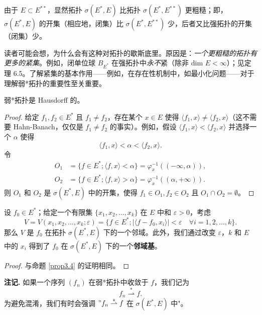 由于 $E \subset E^{**}$，显然拓扑 $\sigma(E^*, E)$ 比拓扑 $\sigma(E^*, E^{**})$ 更粗糙；即，$\sigma(E^*, E)$ 的开集（相应地，闭集）比 $\sigma(E^*, E^{**})$ 少，后者又比强拓扑的开集（闭集）少。

\begin{remark}\label{remark3.8}
读者可能会想，为什么会有这种对拓扑的歇斯底里。原因是：\textit{一个更粗糙的拓扑有更多的紧集}。例如，闭单位球 $B_{E^*}$ 在强拓扑中\textit{永不}紧（除非 dim $E < \infty$）；见定理 6.5。了解紧集的基本作用——例如，在存在性机制中，如最小化问题——对于理解弱*拓扑的重要性至关重要。
\end{remark}

\begin{proposition}\label{prop3.11}
弱*拓扑是 Hausdorff 的。
\end{proposition}

\begin{proof}
给定 $f_1, f_2 \in E^*$ 且 $f_1 \neq f_2$，存在某个 $x \in E$ 使得 $\langle f_1, x \rangle \neq \langle f_2, x \rangle$（这不需要 Hahn-Banach，仅仅是 $f_1 \neq f_2$ 的事实）。例如，假设 $\langle f_1, x \rangle < \langle f_2, x \rangle$ 并选择一个 $\alpha$ 使得
\[ \langle f_1, x \rangle < \alpha < \langle f_2, x \rangle. \]
令
\begin{align*}
O_1 &= \{ f \in E^*; \langle f, x \rangle < \alpha \} = \varphi_x^{-1}((-\infty, \alpha)), \\
O_2 &= \{ f \in E^*; \langle f, x \rangle > \alpha \} = \varphi_x^{-1}((\alpha, +\infty)).
\end{align*}
则 $O_1$ 和 $O_2$ 是 $\sigma(E^*, E)$ 中的开集，使得 $f_1 \in O_1, f_2 \in O_2$ 且 $O_1 \cap O_2 = \emptyset$。
\end{proof}

\begin{proposition}\label{prop3.12}
设 $f_0 \in E^*$；给定一个有限集 $\{x_1, x_2, \dots, x_k\}$ 在 $E$ 中和 $\varepsilon > 0$，考虑
\[ V = V(x_1, x_2, \dots, x_k; \varepsilon) = \{f \in E^*; |\langle f - f_0, x_i \rangle| < \varepsilon \quad \forall i = 1, 2, \dots, k\}. \]
那么 $V$ 是 $f_0$ 在拓扑 $\sigma(E^*, E)$ 下的一个邻域。此外，我们通过改变 $\varepsilon$，$k$ 和 $E$ 中的 $x_i$ 得到了 $f_0$ 在 $\sigma(E^*, E)$ 下的一个\textbf{邻域基}。
\end{proposition}

\begin{proof}
与命题 \ref{prop3.4} 的证明相同。
\end{proof}

\textbf{注记.} 如果一个序列 $(f_n)$ 在弱*拓扑中收敛于 $f$，我们记为
\[ f_n \stackrel{*}{\rightharpoonup} f. \]
为避免混淆，我们有时会强调 $"f_n \stackrel{*}{\rightharpoonup} f$ 在 $\sigma(E^*, E)$ 中"。

